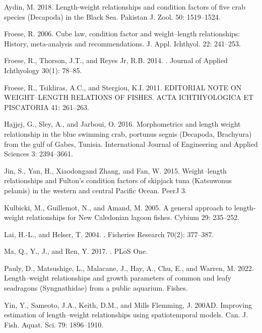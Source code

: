 \documentclass[12pt]{article}\usepackage[]{graphicx}\usepackage[]{color}
\begin{document}
\label{refs}
\begin{CSLReferences}{1}{0}
Aydin, M. 2018. Length-weight relationships and condition factors of five crab species ({D}ecapoda) in the {B}lack {S}ea. Pakistan J. Zool. 50: 1519--1524.

Froese, R. 2006. Cube law, condition factor and weight--length relationships: History, meta-analysis and recommendations. J. Appl. Ichthyol. 22: 241--253.

Froese, R., Thorson, J.T., and Reyes Jr, R.B. 2014. . Journal of Applied Ichthyology 30(1): 78--85.

Froese, R., Tsikliras, A.C., and Stergiou, K.I. 2011. EDITORIAL NOTE ON WEIGHT--LENGTH RELATIONS OF FISHES. ACTA ICHTHYOLOGICA ET PISCATORIA 41: 261--263.

Hajjej, G., Sley, A., and Jarboui, O. 2016. Morphometrics and length weight relationship in the blue swimming crab, portunus segnis ({D}ecapoda, {B}rachyura) from the gulf of {G}abes, {T}unisia. International Journal of Engineering and Applied Sciences 3: 2394--3661.

Jin, S., Yan, H., Xiaodongand Zhang, and Fan, W. 2015. Weight--length relationships and {F}ulton's condition factors of skipjack tuna ({K}atsuwonus pelamis) in the western and central {P}acific {O}cean. PeerJ 3.

Kulbicki, M., Guillemot, N., and Amand, M. 2005. A general approach to length-weight relationships for {N}ew {C}aledonian lagoon fishes. Cybium 29: 235--252.

Lai, H.-L., and Helser, T. 2004. . Fisheries Research 70(2): 377--387.

Ma, Q., Y., J., and Ren, Y. 2017. . PLoS One.

Pauly, D., Matsushige, L., Malacane, J., Hay, A., Chu, E., and Warren, M. 2022. Length--weight relationships and growth parameters of common and leafy seadragons ({S}yngnathidae) from a public aquarium. Fishes.

Yin, Y., Sameoto, J.A., Keith, D.M., and Mills Flemming, J. 200AD. Improving estimation of length--weight relationships using spatiotemporal models. Can. J. Fish. Aquat. Sci. 79: 1896--1910.

\end{CSLReferences}
\end{document}

